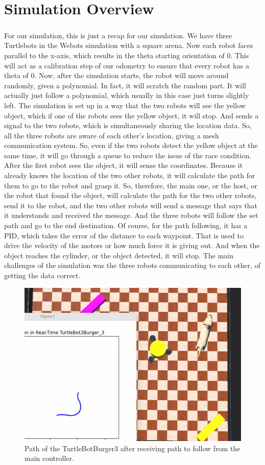 \chapter{Simulation Overview}
\paragraph*{}
For our simulation, this is just a recap for our simulation. We have three Turtlebots in the Webots simulation with a square arena. Now each robot faces parallel to the x-axis, which results in the theta starting orientation of 0. This will act as a calibration step of our odometry to ensure that every robot has a theta of 0. Now, after the simulation starts, the robot will move around randomly, given a polynomial. In fact, it will scratch the random part. It will actually just follow a polynomial, which usually in this case just turns slightly left. The simulation is set up in a way that the two robots will see the yellow object, which if one of the robots sees the yellow object, it will stop. And sends a signal to the two robots, which is simultaneously sharing the location data. So, all the three robots are aware of each other's location, giving a mesh communication system. So, even if the two robots detect the yellow object at the same time, it will go through a queue to reduce the issue of the race condition. After the first robot sees the object, it will sense the coordinates. Because it already knows the location of the two other robots, it will calculate the path for them to go to the robot and grasp it. So, therefore, the main one, or the host, or the robot that found the object, will calculate the path for the two other robots, send it to the robot, and the two other robots will send a message that says that it understands and received the message. And the three robots will follow the set path and go to the end destination. Of course, for the path following, it has a PID, which takes the error of the distance to each waypoint. That is used to drive the velocity of the motors or how much force it is giving out. And when the object reaches the cylinder, or the object detected, it will stop. The main challenges of the simulation was the three robots communicating to each other, of getting the data correct.

\begin{figure}
    \centering
    \includegraphics[width=0.5\linewidth]{assets/images/simulation_overview/sim_1.png}
    \caption{Path of the TurtleBotBurger3 after receiving path to follow from the main controller.}
    \label{fig:object detection figure 1} 
\end{figure}

